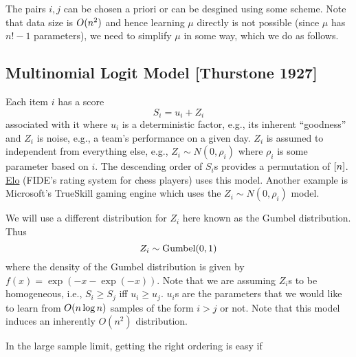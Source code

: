 \documentclass[letterpaper, 12pt, reqno]{amsart}
\begin{document}
The pairs $i, j$ can be chosen a priori or can be desgined using some scheme. Note that data size is $O(n^2)$ and hence learning $\mu$ directly is not possible (since $\mu$ has $n!-1$ parameters), we need to simplify $\mu$ in some way, which we do as follows.

\subsection{Multinomial Logit Model [Thurstone 1927]}

Each item $i$ has a score
$$S_i = u_i + Z_i$$
associated with it where $u_i$ is a deterministic factor, e.g., its inherent ``goodness'' and $Z_i$ is noise, e.g., a team's performance on a given day. $Z_i$ is assumed to independent from everything else, e.g., $Z_i \sim N(0, \rho_i)$ where $\rho_i$ is some parameter based on $i$. The descending order of $S_i$s provides a permutation of $[n]$. \href{http://www.2700chess.com}{Elo} (FIDE's rating system for chess players) uses this model. Another example is Microsoft's TrueSkill gaming engine which uses the $Z_i \sim N(0, \rho_i)$ model.

We will use a different distribution for $Z_i$ here known as the Gumbel distribution. Thus
$$Z_i \sim \textrm{Gumbel}(0,1)$$
where the density of the Gumbel distribution is given by $f(x) = \exp(-x -\exp(-x))$. Note that we are assuming $Z_i$s to be homogeneous, i.e., $S_i \geq S_j$ iff $u_i \geq u_j$. $u_i$s are the parameters that we would like to learn from $O(n \log n)$ samples of the form $i > j$ or not. Note that this model induces an inherently $O(n^2)$ distribution.

\begin{remark}
In the large sample limit, getting the right ordering is easy if
\end{remark}
\end{document}
